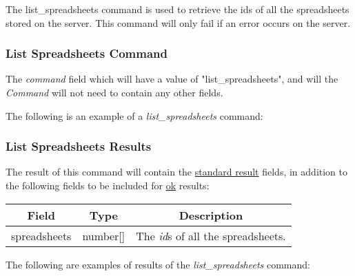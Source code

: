 The list\_spreadsheets command is used to retrieve the ids of all the 
spreadsheets stored on the server. This command will only fail if an error 
occurs on the server.

\subsubsection{List Spreadsheets Command}
The \emph{command} field which will have a value of "list\_spreadsheets", and will the \emph{Command} will not need to contain any other fields.

The following is an example of a \emph{list\_spreadsheets} command:


\subsubsection{List Spreadsheets Results}
The result of this command will contain the \hyperref[sec:message:result]{standard result} fields, in addition to the following fields to be included for \underline{ok} results:
\begin{table}[H]
    \begin{center}
        \begin{tabular}{|c|c|c|}\hline
            Field & Type & Description \\\hline
            spreadsheets & number[] & The \emph{id}s of all the spreadsheets. \\\hline
        \end{tabular}
    \end{center}
\end{table}

The following are examples of results of the \emph{list\_spreadsheets} command:




